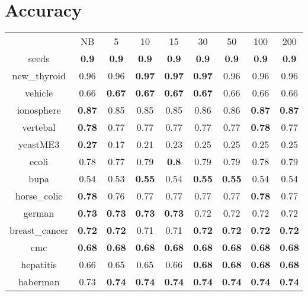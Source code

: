 \documentclass{article}%
\begin{document}
%
\normalsize%
\section*{Accuracy}%
\begin{tabular}{c|cccccccc}%

&NB&5&10&15&30&50&100&200\\%

seeds&\textbf{0.9}&\textbf{0.9}&\textbf{0.9}&\textbf{0.9}&\textbf{0.9}&\textbf{0.9}&\textbf{0.9}&\textbf{0.9}\\%

new\_thyroid&0.96&0.96&\textbf{0.97}&\textbf{0.97}&\textbf{0.97}&0.96&0.96&0.96\\%

vehicle&0.66&\textbf{0.67}&\textbf{0.67}&\textbf{0.67}&\textbf{0.67}&0.66&0.66&0.66\\%

ionosphere&\textbf{0.87}&0.85&0.85&0.85&0.86&0.86&\textbf{0.87}&\textbf{0.87}\\%

vertebal&\textbf{0.78}&0.77&0.77&0.77&0.77&0.77&\textbf{0.78}&0.77\\%

yeastME3&\textbf{0.27}&0.17&0.21&0.23&0.25&0.25&0.25&0.25\\%

ecoli&0.78&0.77&0.79&\textbf{0.8}&0.79&0.79&0.78&0.79\\%

bupa&0.54&0.53&\textbf{0.55}&0.54&\textbf{0.55}&\textbf{0.55}&0.54&0.54\\%

horse\_colic&\textbf{0.78}&0.76&0.77&0.77&0.77&0.77&\textbf{0.78}&0.77\\%

german&\textbf{0.73}&\textbf{0.73}&\textbf{0.73}&\textbf{0.73}&0.72&0.72&0.72&0.72\\%

breast\_cancer&\textbf{0.72}&\textbf{0.72}&0.71&0.71&\textbf{0.72}&\textbf{0.72}&\textbf{0.72}&\textbf{0.72}\\%

cmc&\textbf{0.68}&\textbf{0.68}&\textbf{0.68}&\textbf{0.68}&\textbf{0.68}&\textbf{0.68}&\textbf{0.68}&\textbf{0.68}\\%

hepatitis&0.66&0.65&0.65&0.66&\textbf{0.68}&\textbf{0.68}&\textbf{0.68}&\textbf{0.68}\\%

haberman&0.73&\textbf{0.74}&\textbf{0.74}&\textbf{0.74}&\textbf{0.74}&\textbf{0.74}&\textbf{0.74}&\textbf{0.74}\\%


\end{tabular}
\end{document}
